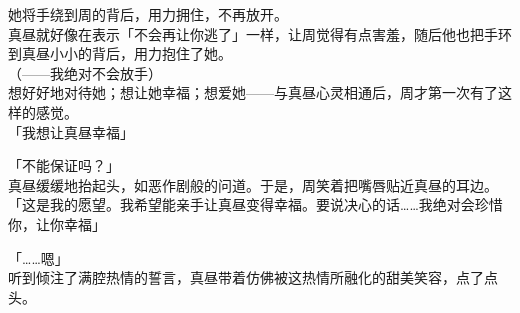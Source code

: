 她将手绕到周的背后，用力拥住，不再放开。\\

真昼就好像在表示「不会再让你逃了」一样，让周觉得有点害羞，随后他也把手环到真昼小小的背后，用力抱住了她。\\

（——我绝对不会放手）\\

想好好地对待她；想让她幸福；想爱她——与真昼心灵相通后，周才第一次有了这样的感觉。\\

「我想让真昼幸福」

「不能保证吗？」\\

真昼缓缓地抬起头，如恶作剧般的问道。于是，周笑着把嘴唇贴近真昼的耳边。\\

「这是我的愿望。我希望能亲手让真昼变得幸福。要说决心的话……我绝对会珍惜你，让你幸福」

「……嗯」\\

听到倾注了满腔热情的誓言，真昼带着仿佛被这热情所融化的甜美笑容，点了点头。
